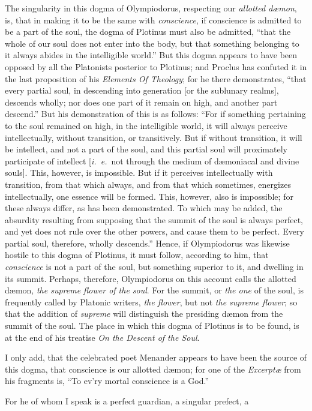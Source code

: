 \documentclass{article}
\begin{document}
{The singularity in this dogma of Olympiodorus, respecting our \textit{allotted
d{\ae}mon}, is, that in making it to be the same with \textit{conscience}, if
conscience is admitted to be a part of the soul, the dogma of Plotinus must
also be admitted, ``that the whole of our soul does not enter into the body,
but that something belonging to it always abides in the intelligible world.''
But this dogma appears to have been opposed by all the Platonists posterior to
Plotinus; and Proclus has confuted it in the last proposition of his
\textit{Elements Of Theology}; for he there demonstrates, ``that every partial
soul, in descending into generation [or the sublunary realms], descends wholly;
nor does one part of it remain on high, and another part descend.'' But his
demonstration of this is as follows: ``For if something pertaining to the soul
remained on high, in the intelligible world, it will always perceive
intellectually, without transition, or transitively. But if without transition,
it will be intellect, and not a part of the soul, and this partial soul will
proximately participate of intellect [\textit{i.~e.}~not through the medium of
d{\ae}moniacal and divine souls]. This, however, is impossible. But if it
perceives intellectually with transition, from that which always, and from that
which sometimes, energizes intellectually, one essence will be formed. This,
however, also is impossible; for these always differ, as has been demonstrated.
To which may be added, the absurdity resulting from supposing that the summit
of the soul is always perfect, and yet does not rule over the other powers, and
cause them to be perfect. Every partial soul, therefore, wholly descends.''
Hence, if Olympiodorus was likewise hostile to this dogma of Plotinus, it must
follow, according to him, that \textit{conscience} is not a part of the soul,
but something superior to it, and dwelling in its summit. Perhaps, therefore,
Olympiodorus on this account calls the allotted d{\ae}mon, \textit{the supreme
flower of the soul}. For the summit, or \textit{the one} of the soul, is
frequently called by Platonic writers, \textit{the flower}, but not \textit{the
supreme flower}; so that the addition of \textit{supreme} will distinguish the
presiding d{\ae}mon from the summit of the soul. The place in which this dogma
of Plotinus is to be found, is at the end of his treatise \textit{On the
Descent of the Soul}.

I only add, that the celebrated poet Menander appears to have been the source
of this dogma, that conscience is our allotted d{\ae}mon; for one of the
\textit{Excerpt{\ae}} from his fragments is, ``To ev'ry mortal conscience is a
God.''} For he of whom I speak is a perfect guardian, a singular prefect, a
\end{document}
